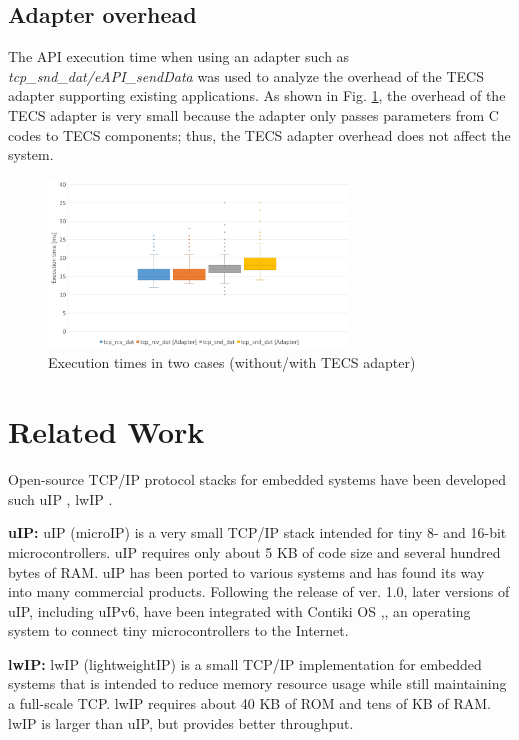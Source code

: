 \documentclass[conference]{IEEEtran/IEEEtran}
\begin{document}
\subsection{Adapter overhead}

The API execution time when using an adapter such as {\it tcp\_snd\_dat/eAPI\_sendData} was used to analyze the overhead of the TECS adapter supporting existing applications.
As shown in Fig. \ref{fig:EvaluationOfAdapter}, the overhead of the TECS adapter is very small because the adapter only passes parameters from C codes to TECS components; thus, the TECS adapter overhead does not affect the system.

\begin{figure}[t]
    \centering
    \includegraphics[width=8.0cm,clip]{figure/EvaluationOfAdapter.pdf}
    \vspace{-1mm} \caption{Execution times in two cases (without/with TECS adapter)}
    \vspace{-1mm} \label{fig:EvaluationOfAdapter}
\end{figure}


\section{Related Work}
\label{sec:Related Work}

Open-source TCP/IP protocol stacks for embedded systems have been developed such uIP \cite{par:uIP}, lwIP \cite{par:lwIP}.

{\bf uIP:}
uIP (microIP) is a very small TCP/IP stack intended for tiny 8- and 16-bit microcontrollers.
uIP requires only about 5 KB of code size and several hundred bytes of RAM.
uIP has been ported to various systems and has found its way into many commercial products.
Following the release of ver. 1.0, later versions of uIP, including uIPv6, have been integrated with Contiki OS \cite{par:Contiki},\cite{url:Contiki}, an operating system to connect tiny microcontrollers to the Internet.

{\bf lwIP:}
lwIP (lightweightIP) is a small TCP/IP implementation for embedded systems that is intended to reduce memory resource usage while still maintaining a full-scale TCP.
lwIP requires about 40 KB of ROM and tens of KB of RAM.
lwIP is larger than uIP, but provides better throughput.
\end{document}

